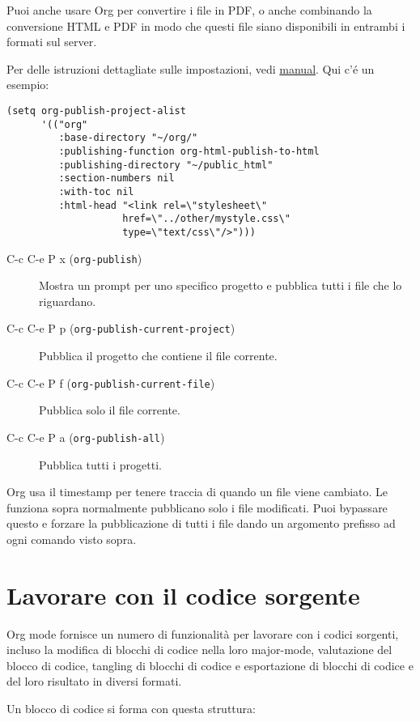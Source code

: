 \documentclass[11pt]{article}
\begin{document}
Puoi anche usare Org per convertire i file in PDF, o anche combinando
la conversione HTML e PDF in modo che questi file siano disponibili in
entrambi i formati sul server.

Per delle istruzioni dettagliate sulle impostazioni, vedi
\url{manual}. Qui c'é un esempio:

\begin{verbatim}
(setq org-publish-project-alist
      '(("org"
         :base-directory "~/org/"
         :publishing-function org-html-publish-to-html
         :publishing-directory "~/public_html"
         :section-numbers nil
         :with-toc nil
         :html-head "<link rel=\"stylesheet\"
                    href=\"../other/mystyle.css\"
                    type=\"text/css\"/>")))
\end{verbatim}

\begin{description}
\item[{C-c C-e P x (\texttt{org-publish})}] Mostra un prompt per uno specifico progetto e pubblica tutti i file
che lo riguardano.

\item[{C-c C-e P p (\texttt{org-publish-current-project})}] Pubblica il progetto che contiene il file corrente.

\item[{C-c C-e P f (\texttt{org-publish-current-file})}] Pubblica solo il file corrente.

\item[{C-c C-e P a (\texttt{org-publish-all})}] Pubblica tutti i progetti.
\end{description}

Org usa il timestamp per tenere traccia di quando un file viene
cambiato. Le funziona sopra normalmente pubblicano solo i file
modificati. Puoi bypassare questo e forzare la pubblicazione di tutti i
file dando un argomento prefisso ad ogni comando visto sopra.

\section{Lavorare con il codice sorgente}
\label{sec:org1624326}
Org mode fornisce un numero di funzionalità per lavorare con i codici
sorgenti, incluso la modifica di blocchi di codice nella loro
major-mode, valutazione del blocco di codice, tangling di blocchi di
codice e esportazione di blocchi di codice e del loro risultato in
diversi formati.

Un blocco di codice si forma con questa struttura:
\end{document}
